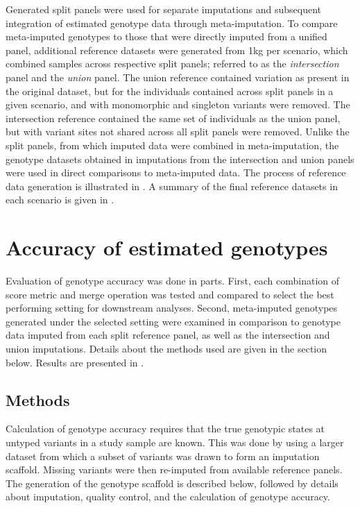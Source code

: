 Generated split panels were used for separate imputations and subsequent integration of estimated genotype data through meta-imputation.
To compare meta-imputed genotypes to those that were directly imputed from a unified panel,  additional reference datasets were generated from \gls{1kg} per scenario, which combined samples across respective split panels; referred to as the \emph{intersection} panel and the \emph{union} panel.
The union reference contained variation as present in the original dataset, but for the individuals contained across split panels in a given scenario, and with monomorphic and singleton variants were removed.
The intersection reference contained the same set of individuals as the union panel, but with variant sites not shared across all split panels were removed.
Unlike the split panels, from which imputed data were combined in meta-imputation, the genotype datasets obtained in imputations from the intersection and union panels were used in direct comparisons to meta-imputed data.
The process of reference data generation is illustrated in .
A summary of the final reference datasets in each scenario is given in .

%

%


%
\section{Accuracy of estimated genotypes}
\label{metaimpute_accuracy}
%

Evaluation of genotype accuracy was done in  parts.
First, each combination of score metric and merge operation was tested and compared to select the best performing setting for downstream analyses.
Second, meta-imputed genotypes generated under the selected setting were examined in comparison to genotype data imputed from each split reference panel, as well as the intersection and union imputations.
Details about the methods used are given in the section below.
Results are presented in .



%
\subsection{Methods}
\label{sec:meta_accuracy_methods}
%

Calculation of genotype accuracy requires that the true genotypic states at untyped variants in a study sample are known.
This was done by using a larger dataset from which a subset of variants was drawn to form an imputation scaffold.
Missing variants were then re-imputed from available reference panels.
The generation of the genotype scaffold is described below, followed by details about imputation, quality control, and the calculation of genotype accuracy.


